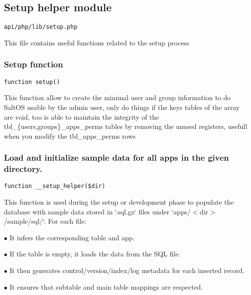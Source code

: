 \documentclass[a4paper]{article}
\begin{document}
\hypertarget{toc527}{}
\subsection{Setup helper module}

\begin{lstlisting}
api/php/lib/setup.php
\end{lstlisting}

This file contains useful functions related to the setup process

\hypertarget{toc528}{}
\subsubsection{Setup function}

\begin{lstlisting}
function setup()
\end{lstlisting}

This function allow to create the minimal user and group information to do SaltOS
usable by the admin user, only do things if the keys tables of the array are void,
too is able to maintain the integrity of the tbl\_\{users,groups\}\_apps\_perms tables
by removing the unused registers, usefull when you modify the tbl\_apps\_perms rows

\hypertarget{toc529}{}
\subsubsection{Load and initialize sample data for all apps in the given directory.}

\begin{lstlisting}
function __setup_helper($dir)
\end{lstlisting}

This function is used during the setup or development phase to populate
the database with sample data stored in `.sql.gz` files under
`apps/$<$dir$>$/sample/sql/`. For each file:

\begin{compactitem}
\item[\color{myblue}$\bullet$] It infers the corresponding table and app.
\item[\color{myblue}$\bullet$] If the table is empty, it loads the data from the SQL file.
\item[\color{myblue}$\bullet$] It then generates control/version/index/log metadata for each inserted record.
\item[\color{myblue}$\bullet$] It ensures that subtable and main table mappings are respected.
\end{compactitem}
\end{document}
